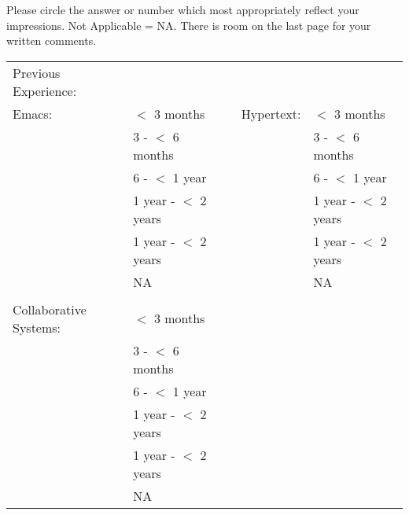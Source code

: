 Please circle the answer or number which most appropriately reflect your
impressions.  Not Applicable = NA.  There is room on the last page for your
written comments.\\
\begin{tabular}{llcll}\\
\hline
Previous Experience:&&\\
Emacs:&\underline{    } $ < $ 3 months&  &Hypertext:&\underline{    } $ < $ 3 months\\\
&\underline{    } 3 -  $ < $ 6 months&  &&\underline{    } 3 -  $ < $ 6 months\\
&\underline{    } 6 - $ < $ 1 year&  &&\underline{    } 6 - $ < $ 1 year\\
&\underline{    } 1 year - $ < $ 2 years&  &&\underline{    } 1 year - $ < $ 2 years\\
&\underline{    } 1 year - $ < $ 2 years&  &&\underline{    } 1 year - $ <
$ 2 years\\
& NA&&&NA\\
\\
Collaborative Systems:&\underline{    } $ < $ 3 months&  &&\\
&\underline{    } 3 -  $ < $ 6 months&  &&\\
&\underline{    } 6 - $ < $ 1 year&  &&\\
&\underline{    } 1 year - $ < $ 2 years&  &&\\
&\underline{    } 1 year - $ < $ 2 years&  &&\\
&NA&&&\\
\end{tabular} \\

